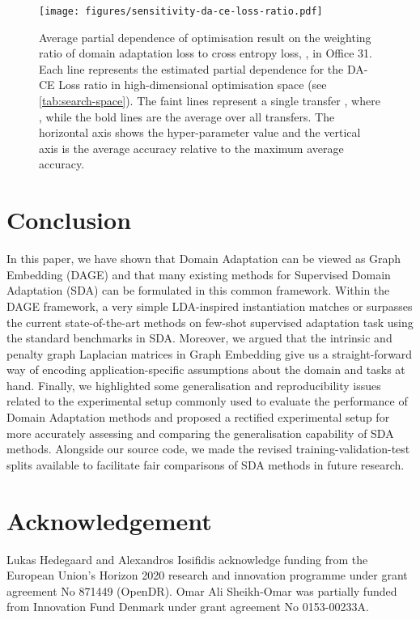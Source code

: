 \documentclass[journal]{IEEEtran}
\begin{document}
\begin{figure}
    \centering
    \texttt{[image: figures/sensitivity-da-ce-loss-ratio.pdf]}
    \caption{
    Average partial dependence of optimisation result on the weighting ratio of domain adaptation loss to cross entropy loss, , in Office 31. 
    Each line represents the estimated partial dependence for the DA-CE Loss ratio in high-dimensional optimisation space (see \cref{tab:search-space}). The faint lines represent a single transfer , where , while the bold lines are the average over all transfers.
    The horizontal axis shows the hyper-parameter value and the vertical axis is the average accuracy relative to the maximum average accuracy.
     }
    \label{fig:sensitivity}
\end{figure}


 \section{Conclusion} \label{sec:conclusion}
In this paper, we have shown that Domain Adaptation can be viewed as Graph Embedding (DAGE) and that many existing methods for Supervised Domain Adaptation (SDA) can be formulated in this common framework. 
Within the DAGE framework, a very simple LDA-inspired instantiation matches or surpasses the current state-of-the-art methods on few-shot supervised adaptation task using the standard benchmarks in SDA.
Moreover, we argued that the intrinsic and penalty graph Laplacian matrices in Graph Embedding give us a straight-forward way of encoding application-specific assumptions about the domain and tasks at hand. 
Finally, we highlighted some generalisation and reproducibility issues related to the experimental setup commonly used to evaluate the performance of Domain Adaptation methods and proposed a rectified experimental setup for more accurately assessing and comparing the generalisation capability of SDA methods. Alongside our source code, we made the revised training-validation-test splits available to facilitate fair comparisons of SDA methods in future research. \section*{Acknowledgement}
Lukas Hedegaard and Alexandros Iosifidis acknowledge funding from the European Union’s Horizon 2020 research and innovation programme under grant agreement No 871449 (OpenDR). Omar Ali Sheikh-Omar was partially funded from Innovation Fund Denmark under grant agreement No 0153-00233A. 
 
\end{document}
